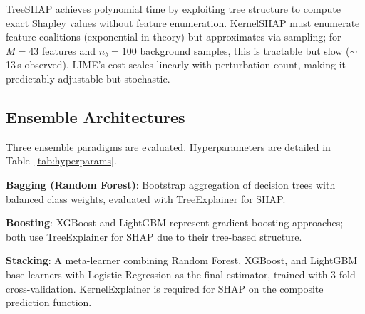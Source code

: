\documentclass[conference]{IEEEtran}
\begin{document}
TreeSHAP achieves polynomial time by exploiting tree structure to compute exact Shapley values without feature enumeration. KernelSHAP must enumerate feature coalitions (exponential in theory) but approximates via sampling; for $M=43$ features and $n_b=100$ background samples, this is tractable but slow ($\sim$13\,s observed). LIME's cost scales linearly with perturbation count, making it predictably adjustable but stochastic.

\subsection{Ensemble Architectures}

Three ensemble paradigms are evaluated. Hyperparameters are detailed in Table~\ref{tab:hyperparams}.

\textbf{Bagging (Random Forest)}: Bootstrap aggregation of decision trees with balanced class weights, evaluated with TreeExplainer for SHAP.

\textbf{Boosting}: XGBoost and LightGBM represent gradient boosting approaches; both use TreeExplainer for SHAP due to their tree-based structure.

\textbf{Stacking}: A meta-learner combining Random Forest, XGBoost, and LightGBM base learners with Logistic Regression as the final estimator, trained with 3-fold cross-validation. KernelExplainer is required for SHAP on the composite prediction function.
\end{document}
